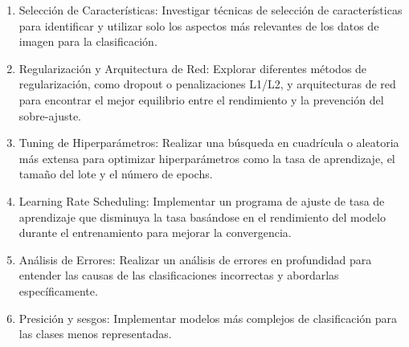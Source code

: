 \begin{recomendations}
\begin{enumerate}
    \item Selección de Características: Investigar técnicas de selección de características para identificar y utilizar solo los aspectos más relevantes de los datos de imagen para la clasificación.
    \item Regularización y Arquitectura de Red: Explorar diferentes métodos de regularización, como dropout o penalizaciones L1/L2, y arquitecturas de red para encontrar el mejor equilibrio entre el rendimiento y la prevención del sobre-ajuste.
    \item Tuning de Hiperparámetros: Realizar una búsqueda en cuadrícula o aleatoria más extensa para optimizar hiperparámetros como la tasa de aprendizaje, el tamaño del lote y el número de epochs.
    \item Learning Rate Scheduling: Implementar un programa de ajuste de tasa de aprendizaje que disminuya la tasa basándose en el rendimiento del modelo durante el entrenamiento para mejorar la convergencia.
    \item Análisis de Errores: Realizar un análisis de errores en profundidad para entender las causas de las clasificaciones incorrectas y abordarlas específicamente.
    \item Presición y sesgos: Implementar modelos más complejos de clasificación para las clases menos representadas.
\end{enumerate}

\end{recomendations}
